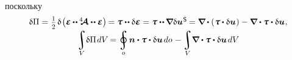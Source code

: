 \begin{otherlanguage}{russian}
\noindent поскольку
\nopagebreak\vspace{.2em}\[
\begin{array}{c}
\variation{\Pi} = \hspace{0.1ex} \smash{\smalldisplaystyleonehalf} \hspace{0.25ex} \variation{ \hspace{-0.2ex} \left( \mathboldepsilon \hspace{-0.1ex} \dotdotp \hspace{-0.1ex} \stiffnesstensor \dotdotp \mathboldepsilon \right) } \hspace{-0.2ex}
= \mathboldtau \dotdotp \variation{\mathboldepsilon}
= \mathboldtau \dotdotp \hspace{-0.12ex} \boldnabla \variation{\bm{u}}^{\hspace{0.1ex}\mathsf{S}} \hspace{-0.16ex}
= \boldnabla \hspace{-0.1ex} \dotp \left( \hspace{0.1ex} \mathboldtau \hspace{-0.1ex} \dotp \variation{\bm{u}} \hspace{0.1ex} \right) - \boldnabla \dotp \mathboldtau \dotp \variation{\bm{u}} \hspace{0.1ex}, \\[0.4em]
%
\displaystyle \integral\displaylimits_V \hspace{-0.5ex} \variation{\Pi} \hspace{0.2ex} dV \hspace{-0.2ex} =
\ointegral\displaylimits_o \hspace{-0.1ex} \bm{n} \dotp \mathboldtau \dotp \variation{\bm{u}} \hspace{0.32ex} do \hspace{0.2ex} - \hspace{-0.1ex}
\integral\displaylimits_V \hspace{-0.5ex} \boldnabla \dotp \mathboldtau \dotp \variation{\bm{u}} \hspace{0.32ex} dV
\end{array}
\]


\end{otherlanguage}

